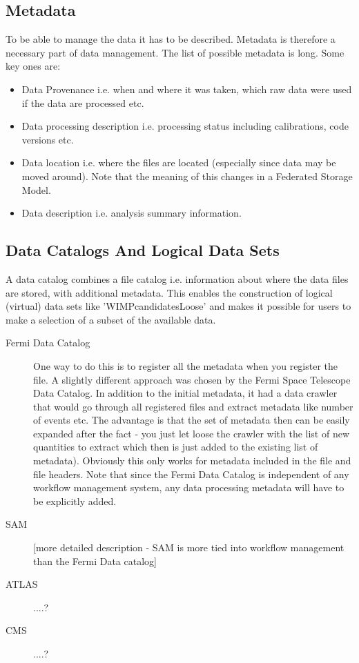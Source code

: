 \subsection{Metadata}
To be able to manage the data it has to be described. Metadata is therefore a necessary part of data management. The 
list of possible metadata is long. Some key ones are:

\begin{itemize}
\item Data Provenance i.e. when and where it was taken, which raw data were used if the data are processed etc.
\item Data processing description i.e. processing status including calibrations, code versions etc.
\item Data location i.e. where the files are located (especially since data may be moved around). Note that the meaning of this changes in a 
Federated Storage Model. 
\item Data description i.e. analysis summary information.
\end{itemize}



\subsection{Data Catalogs And Logical Data Sets}
A data catalog combines a file catalog i.e. information about where the data files are stored, with additional metadata.
This enables the construction of logical (virtual) data sets like 'WIMPcandidatesLoose' and makes it possible for users to 
make a selection of a subset of the available data.

\begin{description}
\item[Fermi Data Catalog] One way to do this is to register all the metadata when you register the file. A slightly
different approach was chosen by the Fermi Space Telescope Data Catalog. In addition to the initial metadata, it had a
data crawler that would go through all registered files and extract metadata like number of events etc. The advantage is
that the set of metadata then can be easily expanded after the fact - you just let loose the crawler with the list
of new quantities to extract which then is just added to the existing list of metadata). Obviously this only works for 
metadata included in the file and file headers.  Note that since the Fermi 
Data Catalog is independent of any workflow management system, any data processing metadata will have to be explicitly added. 


\item[SAM] [more detailed description - SAM is more tied into workflow management than the Fermi Data catalog]

\item[ATLAS] ....?

\item[CMS] ....?

\end{description}



